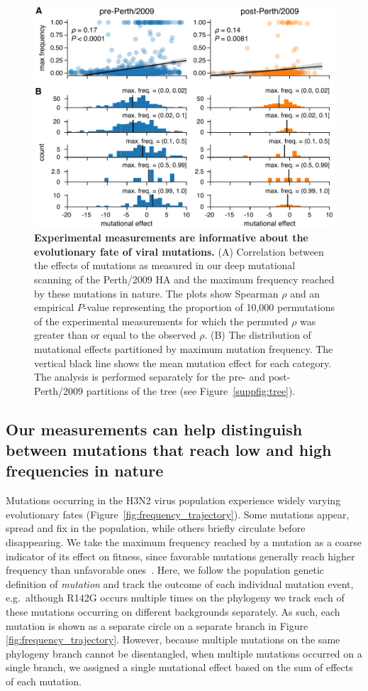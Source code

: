 \documentclass[9pt,twocolumn,twoside]{pnas-new-for-biorxiv}
\begin{document}
\begin{figure}
\centering
\includegraphics[width=12cm]{figs/muteffect_by_maxfreq/muteffect_by_maxfreq.pdf}
\caption{\label{fig:muteffect_maxfreq}
{\bf Experimental measurements are informative about the evolutionary fate of viral mutations.}
(A) Correlation between the effects of mutations as measured in our deep mutational scanning of the Perth/2009 HA and the maximum frequency reached by these mutations in nature.
The plots show Spearman $\rho$ and an empirical $P$-value representing the proportion of 10,000 permutations of the experimental measurements for which the permuted $\rho$ was greater than or equal to the observed $\rho$.
(B) The distribution of mutational effects partitioned by maximum mutation frequency.
The vertical black line shows the mean mutation effect for each category.
The analysis is performed separately for the pre- and post-Perth/2009 partitions of the tree (see Figure~\ref{suppfig:tree}).
}
\end{figure}

\subsection*{Our measurements can help distinguish between mutations that reach low and high frequencies in nature}
Mutations occurring in the H3N2 virus population experience widely varying evolutionary fates (Figure~\ref{fig:frequency_trajectory}).
Some mutations appear, spread and fix in the population, while others briefly circulate before disappearing.
We take the maximum frequency reached by a mutation as a coarse indicator of its effect on fitness, since favorable mutations generally reach higher frequency than unfavorable ones~\cite{ewens2012mathematical}.
Here, we follow the population genetic definition of \textit{mutation} and track the outcome of each individual mutation event, e.g.\ although R142G occurs multiple times on the phylogeny we track each of these mutations occurring on different backgrounds separately.
As such, each mutation is shown as a separate circle on a separate branch in Figure \ref{fig:frequency_trajectory}.
However, because multiple mutations on the same phylogeny branch cannot be disentangled, when multiple mutations occurred on a single branch, we assigned a single mutational effect based on the sum of effects of each mutation.
\end{document}
